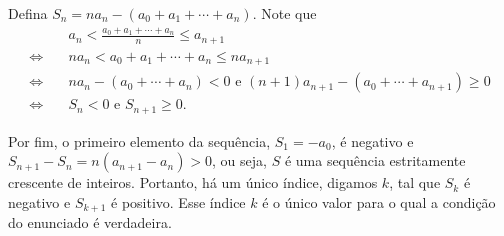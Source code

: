 Defina $S_n = na_n - (a_0 + a_1 + \cdots + a_n)$.
Note que
\begin{align*}
	& a_n < \frac{a_0 + a_1 + \cdots + a_n}{n} \le a_{n+1} \\
	\iff\quad & na_n < a_0 + a_1 + \cdots + a_n \le na_{n+1} \\
	\iff\quad & na_n - (a_0 + \cdots + a_n) < 0 \text{ e } (n+1)a_{n+1} - (a_0 + \cdots + a_{n+1}) \ge 0 \\
	\iff\quad & S_n < 0 \text{ e } S_{n+1} \ge 0.
\end{align*}

Por fim, o primeiro elemento da sequência, $S_1 = - a_0$, é negativo e $S_{n+1} - S_n = n(a_{n+1} - a_n) > 0$, ou seja, $S$ é uma sequência estritamente crescente de inteiros.
Portanto, há um único índice, digamos $k$, tal que $S_k$ é negativo e $S_{k+1}$ é positivo. Esse índice $k$ é o único valor para o qual a condição do enunciado é verdadeira.
